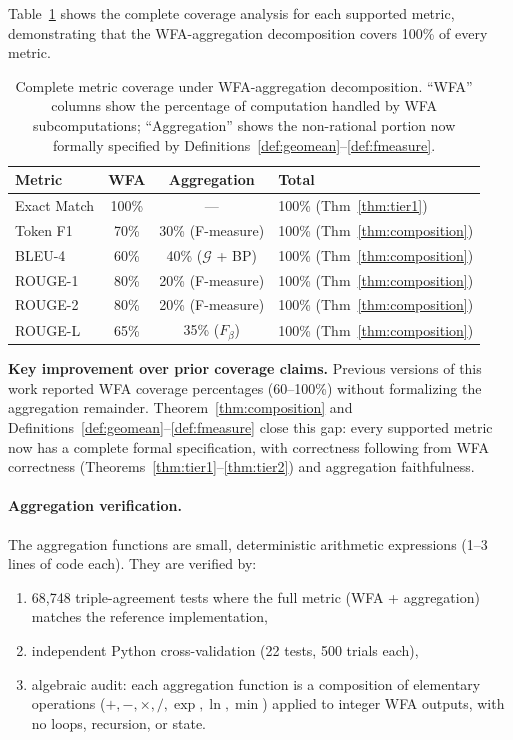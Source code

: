 \documentclass[11pt]{article}
\begin{document}
Table~\ref{tab:coverage-complete} shows the complete coverage
analysis for each supported metric, demonstrating that the
WFA-aggregation decomposition covers 100\% of every metric.

\begin{table}[h]
\centering
\caption{Complete metric coverage under WFA-aggregation decomposition.
  ``WFA'' columns show the percentage of computation handled by
  WFA subcomputations; ``Aggregation'' shows the non-rational
  portion now formally specified by
  Definitions~\ref{def:geomean}--\ref{def:fmeasure}.}
\label{tab:coverage-complete}
\smallskip
\begin{tabular}{@{}lccl@{}}
\toprule
\textbf{Metric} & \textbf{WFA} & \textbf{Aggregation} & \textbf{Total} \\
\midrule
Exact Match  & 100\% & ---       & 100\% (Thm~\ref{thm:tier1}) \\
Token F1     & 70\%  & 30\% (F-measure)  & 100\% (Thm~\ref{thm:composition}) \\
BLEU-4       & 60\%  & 40\% ($\mathcal{G}$ + BP) & 100\% (Thm~\ref{thm:composition}) \\
ROUGE-1      & 80\%  & 20\% (F-measure)  & 100\% (Thm~\ref{thm:composition}) \\
ROUGE-2      & 80\%  & 20\% (F-measure)  & 100\% (Thm~\ref{thm:composition}) \\
ROUGE-L      & 65\%  & 35\% ($F_\beta$)  & 100\% (Thm~\ref{thm:composition}) \\
\bottomrule
\end{tabular}
\end{table}

\noindent
\textbf{Key improvement over prior coverage claims.}
Previous versions of this work reported WFA coverage percentages
(60--100\%) without formalizing the aggregation remainder.
Theorem~\ref{thm:composition} and
Definitions~\ref{def:geomean}--\ref{def:fmeasure} close this gap:
every supported metric now has a complete formal specification,
with correctness following from WFA correctness
(Theorems~\ref{thm:tier1}--\ref{thm:tier2}) and aggregation
faithfulness.

\paragraph{Aggregation verification.}
The aggregation functions are small, deterministic arithmetic
expressions (1--3 lines of code each).  They are verified by:
\begin{enumerate}[nosep]
\item 68{,}748 triple-agreement tests where the full metric
  (WFA + aggregation) matches the reference implementation,
\item independent Python cross-validation (22 tests, 500 trials each),
\item algebraic audit: each aggregation function is a composition of
  elementary operations ($+, -, \times, /, \exp, \ln, \min$) applied
  to integer WFA outputs, with no loops, recursion, or state.
\end{enumerate}
\end{document}

